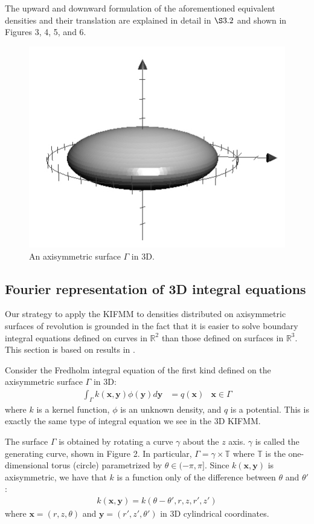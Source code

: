 \documentclass[12pt,letterpaper]{article}
\begin{document}
The upward and downward formulation of the aforementioned equivalent densities and their translation are explained in detail in $\S3.2$ and shown in Figures 3, 4, 5, and 6.

\begin{figure}[!ht]
\begin{center}
\includegraphics[scale=0.9]{3dsurface}
\end{center}
\caption{An axisymmetric surface $\Gamma$ in 3D.}
\end{figure}

\subsection{Fourier representation of 3D integral equations}
Our strategy to apply the KIFMM to densities distributed on axisymmetric surfaces of revolution is grounded in the fact that it is easier to solve boundary integral equations defined on curves in $\mathbb{R}^2$ than those defined on surfaces in $\mathbb{R}^3$. This section is based on results in \cite{YYM}.

Consider the Fredholm integral equation of the first kind defined on the axisymmetric surface $\Gamma$ in 3D:
\begin{align}
\int_\Gamma k(\mathbf{x},\mathbf{y})\phi(\mathbf{y})d\mathbf{y} &= q(\mathbf{x}) &\mathbf{x}\in\Gamma
\end{align}
where $k$ is a kernel function, $\phi$ is an unknown density, and $q$ is a potential. This is exactly the same type of integral equation we see in the 3D KIFMM.

The surface $\Gamma$ is obtained by rotating a curve $\gamma$ about the $z$ axis. $\gamma$ is called the generating curve, shown in Figure 2. In particular, $\Gamma=\gamma\times\mathbb{T}$ where $\mathbb{T}$ is the one-dimensional torus (circle) parametrized by $\theta\in(-\pi,\pi]$. Since $k(\mathbf{x},\mathbf{y})$ is axisymmetric, we have that $k$ is a function only of the difference between $\theta$ and $\theta'$:
\begin{align}
k(\mathbf{x},\mathbf{y})=k(\theta-\theta',r,z,r',z')
\end{align}
where $\mathbf{x}=(r,z,\theta)$ and $\mathbf{y}=(r',z',\theta')$  in 3D cylindrical coordinates.
\end{document}
